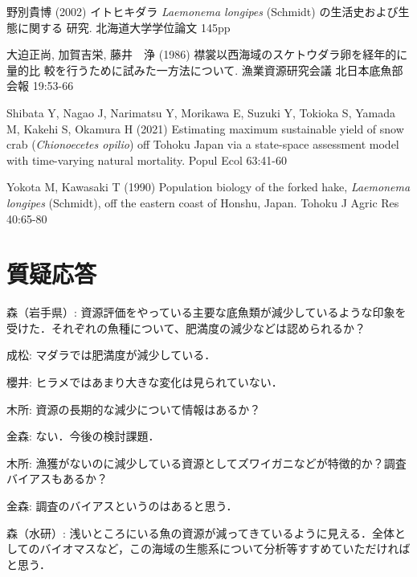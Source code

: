 \documentclass[11pt]{article} %
\begin{document}
\begin{linenumbers}
\hangindent=30pt
\noindent
野別貴博 (2002) イトヒキダラ \textit{Laemonema longipes} (Schmidt) の生活史および生態に関する
研究. 北海道大学学位論文 145pp

\hangindent=30pt
\noindent
大迫正尚, 加賀吉栄, 藤井　浄 (1986) 襟裳以西海域のスケトウダラ卵を経年的に量的比
較を行うために試みた一方法について. 漁業資源研究会議 北日本底魚部会報 19:53-66


\hangindent=30pt
\noindent
Shibata Y, Nagao J, Narimatsu Y, Morikawa E, Suzuki Y, Tokioka S, Yamada M, Kakehi S, 
Okamura H (2021) Estimating maximum sustainable yield of snow crab (\textit{Chionoecetes opilio}) off Tohoku Japan via a state-space assessment model with time-varying natural mortality. Popul Ecol 63:41-60

\hangindent=30pt
\noindent
Yokota M, Kawasaki T (1990) Population biology of the forked hake, \textit{Laemonema longipes} 
 (Schmidt), off the eastern coast of Honshu, Japan. Tohoku J Agric Res 40:65-80 
 
 
\section{質疑応答}
森（岩手県）: 資源評価をやっている主要な底魚類が減少しているような印象を受けた．それぞれの魚種について、肥満度の減少などは認められるか？

成松: マダラでは肥満度が減少している．

櫻井: ヒラメではあまり大きな変化は見られていない．

木所: 資源の長期的な減少について情報はあるか？  

金森: ない．今後の検討課題．

木所: 漁獲がないのに減少している資源としてズワイガニなどが特徴的か？調査バイアスもあるか？

金森: 調査のバイアスというのはあると思う．

森（水研）: 浅いところにいる魚の資源が減ってきているように見える．全体としてのバイオマスなど，この海域の生態系について分析等すすめていただければと思う．


\end{linenumbers}
\end{document}
